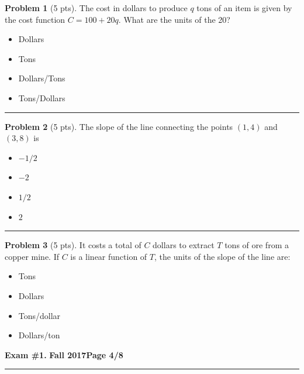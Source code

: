 \documentclass[12pt]{article}
\makeatletter
\theoremstyle{definition}
\newtheorem{problem}{Problem}
\newcommand*{\radiobutton}{%
  \@ifstar{\@radiobutton0}{\@radiobutton1}%
}
\newcommand*{\@radiobutton}[1]{%
  \begin{tikzpicture}
    \pgfmathsetlengthmacro\radius{height("X")/2}
    \draw[radius=\radius] circle;
    \ifcase#1 \fill[radius=.6*\radius] circle;\fi
  \end{tikzpicture}%
}
\makeatother
\begin{document}
\begin{problem}[5 pts]
The cost in dollars to produce $q$ tons of an item is given by the cost function $C = 100 + 20q$. What are the units of the 20?
\begin{itemize}
\item[\radiobutton] Dollars
\item[\radiobutton] Tons
\item[\radiobutton] Dollars/Tons
\item[\radiobutton] Tons/Dollars
\end{itemize} 
\end{problem}
\hrule

\begin{problem}[5 pts]
The slope of the line connecting the points $(1, 4)$ and $(3, 8)$ is
\begin{itemize}
\item[\radiobutton] $-1/2$
\item[\radiobutton] $-2$
\item[\radiobutton] $1/2$
\item[\radiobutton] $2$
\end{itemize}
\end{problem}
\hrule

\begin{problem}[5 pts]
It costs a total of $C$ dollars to extract $T$ tons of ore from a copper mine. If $C$ is a linear function of $T$, the units of the slope of the line are:
\begin{itemize}
\item[\radiobutton] Tons
\item[\radiobutton] Dollars
\item[\radiobutton] Tons/dollar
\item[\radiobutton] Dollars/ton
\end{itemize}
\end{problem}

\newpage

\hfill{\large\bf Exam \#1.}\hfill{\large\bf
  Fall 2017}\hfill{\large\bf Page 4/8}\hrule
\end{document}
